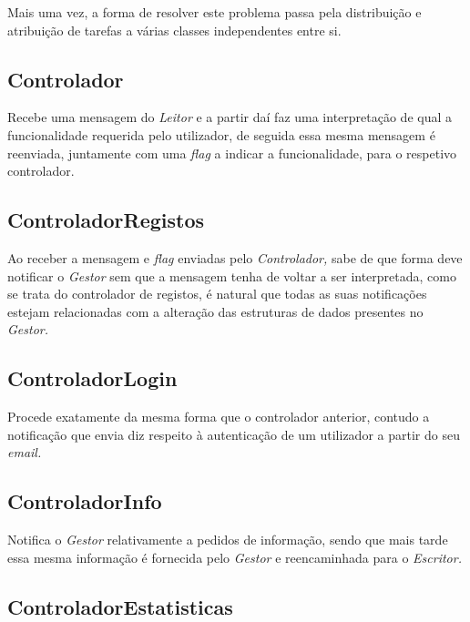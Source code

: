     Mais uma vez, a forma de resolver este problema passa pela distribuição e atribuição de tarefas a várias classes independentes entre si.

    \subsection{Controlador}

    Recebe uma mensagem do \textit{Leitor} e a partir daí faz uma interpretação de qual a funcionalidade requerida pelo utilizador, de seguida essa mesma mensagem é reenviada, juntamente com uma \textit{flag} a indicar a funcionalidade, para o respetivo controlador.
    
    \vspace*{-5pt}
    \subsection{ControladorRegistos}
    
    Ao receber a mensagem e \textit{flag} enviadas pelo \textit{Controlador,} sabe de que forma deve notificar o \textit{Gestor} sem que a mensagem tenha de voltar a ser interpretada, como se trata do controlador de registos, é natural que todas as suas notificações estejam relacionadas com a alteração das estruturas de dados presentes no \textit{Gestor.}

    \vspace*{-5pt}
    \subsection{ControladorLogin}
    
    Procede exatamente da mesma forma que o controlador anterior, contudo a notificação que envia diz respeito à autenticação de um utilizador a partir do seu \textit{email.}

    \vspace*{-5pt}
    \subsection{ControladorInfo}
    
    Notifica o \textit{Gestor} relativamente a pedidos de informação, sendo que mais tarde essa mesma informação é fornecida pelo \textit{Gestor} e reencaminhada para o \textit{Escritor.}

    \vspace*{-5pt}
    \subsection{ControladorEstatisticas}
    
